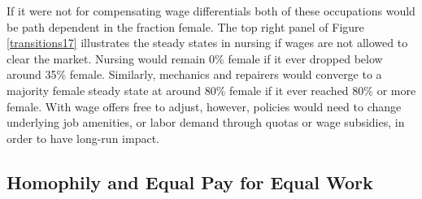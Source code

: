 \documentclass[12pt]{article}
\begin{document}
If it were not for compensating wage differentials both of these occupations would be path dependent in the fraction female. The top right panel of Figure \ref{transitions17} illustrates the steady states in nursing if wages are not allowed to clear the market. Nursing would remain 0\% female if it ever dropped below around 35\% female. Similarly, mechanics and repairers would converge to a majority female steady state at around 80\% female if it ever reached 80\% or more female. With wage offers free to adjust, however, policies would need to change underlying job amenities, or labor demand through quotas or wage subsidies, in order to have long-run impact.







\subsection{Homophily and Equal Pay for Equal Work}

\end{document}
